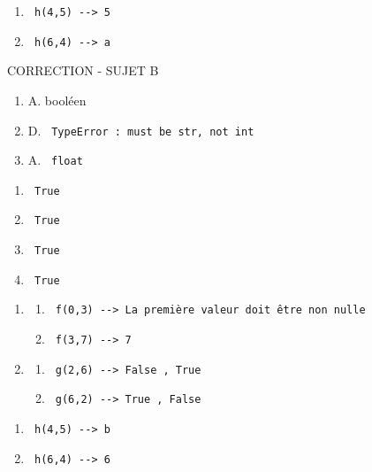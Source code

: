 \documentclass[a4paper,12pt,openany]{book}
\begin{document}
  \medskip
  
  \exo
  
  \begin{enumerate}
  	\item \verb+ h(4,5) --> 5+
  	\item \verb+ h(6,4) --> a+
  \end{enumerate}
  
  \bigskip
  
  \begin{center}
  {\LARGE CORRECTION - SUJET B}
  \end{center}
  
  \setcounter{nexo}{0}
  
 \exo
  
  \begin{enumerate}
  	\item A. booléen
  	\item D. \verb+ TypeError : must be str, not int+
  	\item A. \verb+ float +
  \end{enumerate}
  
  \medskip
  
  \exo 
  
  \begin{enumerate}
  	\item \verb+ True +
  	\item \verb+ True +
  	\item \verb+ True +
  	\item \verb+ True +
  \end{enumerate}
  
  \medskip
  
  \exo
  
  \begin{enumerate}
  \item 
  \begin{enumerate}
  	\item \verb+ f(0,3) --> La première valeur doit être non nulle+
  	\item \verb+ f(3,7) --> 7+
  \end{enumerate}
  
  \medskip
  
	\item   
  \begin{enumerate}
  	\item \verb+ g(2,6) --> False , True +
  	\item \verb+ g(6,2) --> True , False+
  \end{enumerate}
  \end{enumerate}
  \medskip
  
  \exo
  
  \begin{enumerate}
  	\item \verb+ h(4,5) --> b+
  	\item \verb+ h(6,4) --> 6+
  \end{enumerate} 
\end{document}
